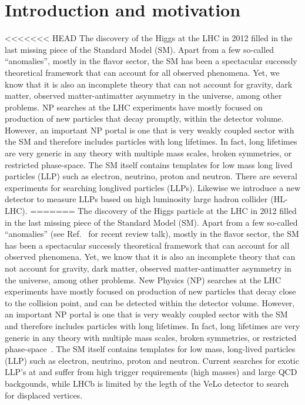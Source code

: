 \section{Introduction and motivation}
\label{sec:Introduction}



<<<<<<< HEAD
The discovery of the Higgs at the LHC in 2012 filled in the last missing piece of the Standard Model (SM). Apart from a few so-called ``anomalies'', mostly in the flavor sector, the SM has been a spectacular successly theoretical framework that can account for all observed phenomena. Yet, we know that it is also an incomplete theory that can not account for gravity, dark matter, observed matter-antimatter asymmetry in the universe, among other problems. NP searches at the LHC experiments have mostly focused on production of new particles that decay promptly, within the detector volume. However, an important NP portal is one that is very weakly coupled sector with the SM and therefore includes particles with long lifetimes. In fact, long lifetimes are very generic in any theory with multiple mass scales, broken symmetries, or restricted phase-space. The SM itself contains templates for low mass long lived particles (LLP) such as electron, neutrino, proton and neutron.
There are several experiments for searching longlived particles (LLPs). 
Likewise we introduce a new detector to measure LLPs based on high luminosity large hadron collider (HL-LHC).
=======
The discovery of the Higgs particle at the LHC in 2012 filled in the last missing piece of the Standard Model (SM). Apart from a few so-called ``anomalies'' (see Ref.~\cite{pich_talk} for recent review talk), mostly in the flavor sector, the SM has been a spectacular successly theoretical framework that can account for all observed phenomena. Yet, we know that it is also an incomplete theory that can not account for gravity, dark matter, observed matter-antimatter asymmetry in the universe, among other problems. New Physics (NP) searches at the LHC experiments have mostly focused on production of new particles that decay close to the collision point, and can be detected within the detector volume. However, an important NP portal is one that is very weakly coupled sector with the SM and therefore includes particles with long lifetimes. In fact, long lifetimes are very generic in any theory with multiple mass scales, broken symmetries, or restricted phase-space~\cite{Curtin:2018mvb}. The SM itself contains templates for low mass, long-lived particles (LLP) such as electron, neutrino, proton and neutron. Current searches for exotic LLP's at \atlas and \cms suffer from high \pt trigger requirements (high masses) and large QCD backgounds, while LHCb is limited by the legth of the VeLo detector to search for displaced vertices. 

